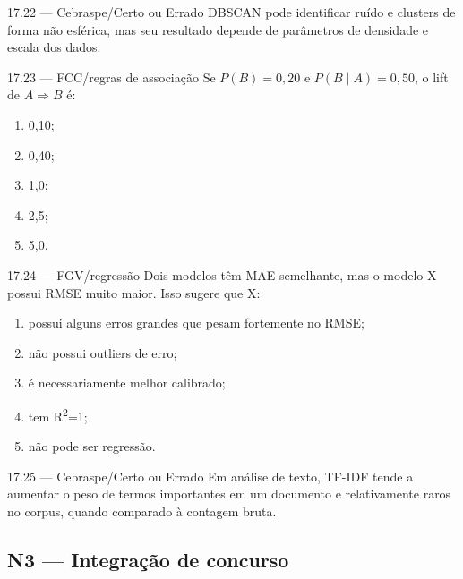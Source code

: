 \begin{questao}{ 17.22 — Cebraspe/Certo ou Errado}
DBSCAN pode identificar ruído e clusters de forma não esférica, mas seu resultado depende de parâmetros de densidade e escala dos dados.
\end{questao}

\begin{questao}{ 17.23 — FCC/regras de associação}
Se $P(B)=0,20$ e $P(B\mid A)=0,50$, o lift de $A\Rightarrow B$ é:
\begin{enumerate}[label=\Alph*)]
\item 0,10;
\item 0,40;
\item 1,0;
\item 2,5;
\item 5,0.
\end{enumerate}
\end{questao}

\begin{questao}{ 17.24 — FGV/regressão}
Dois modelos têm MAE semelhante, mas o modelo X possui RMSE muito maior. Isso sugere que X:
\begin{enumerate}[label=\Alph*)]
\item possui alguns erros grandes que pesam fortemente no RMSE;
\item não possui outliers de erro;
\item é necessariamente melhor calibrado;
\item tem R\textsuperscript{2}=1;
\item não pode ser regressão.
\end{enumerate}
\end{questao}

\begin{questao}{ 17.25 — Cebraspe/Certo ou Errado}
Em análise de texto, TF-IDF tende a aumentar o peso de termos importantes em um documento e relativamente raros no corpus, quando comparado à contagem bruta.
\end{questao}

\subsection*{N3 — Integração de concurso}

